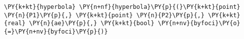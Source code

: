 \begin{Verbatim}[commandchars=\\\{\}]
    \PY{k+kt}{hyperbola} \PY{n+nf}{hyperbola}\PY{p}{(}\PY{k+kt}{point} \PY{n}{P1}\PY{p}{,} \PY{k+kt}{point} \PY{n}{P2}\PY{p}{,} \PY{k+kt}{real} \PY{n}{ae}\PY{p}{,} \PY{k+kt}{bool} \PY{n+nv}{byfoci}\PY{o}{=}\PY{n+nv}{byfoci}\PY{p}{)}
\end{Verbatim}
